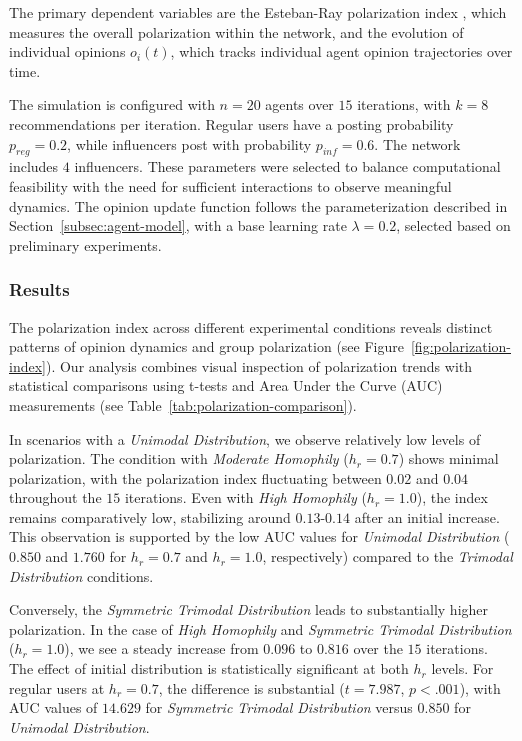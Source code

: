 The primary dependent variables are the Esteban-Ray polarization index \citep{esteban_on_1994}, which measures the overall polarization within the network, and the evolution of individual opinions $o_i(t)$, which tracks individual agent opinion trajectories over time.

The simulation is configured with $n = 20$ agents over $15$ iterations, with $k = 8$ recommendations per iteration. Regular users have a posting probability $p_{reg} = 0.2$, while influencers post with probability $p_{inf} = 0.6$. The network includes $4$ influencers. These parameters were selected to balance computational feasibility with the need for sufficient interactions to observe meaningful dynamics. The opinion update function follows the parameterization described in Section~\ref{subsec:agent-model}, with a base learning rate $\lambda = 0.2$, selected based on preliminary experiments.



\subsubsection{Results}

The polarization index across different experimental conditions reveals distinct patterns of opinion dynamics and group polarization (see Figure~\ref{fig:polarization-index}). Our analysis combines visual inspection of polarization trends with statistical comparisons using t-tests and Area Under the Curve (AUC) measurements (see Table~\ref{tab:polarization-comparison}).

In scenarios with a \emph{Unimodal Distribution}, we observe relatively low levels of polarization. The condition with \emph{Moderate Homophily} ($h_r = 0.7$) shows minimal polarization, with the polarization index fluctuating between $0.02$ and $0.04$ throughout the $15$ iterations. Even with \emph{High Homophily} ($h_r = 1.0$), the index remains comparatively low, stabilizing around $0.13$-$0.14$ after an initial increase. This observation is supported by the low AUC values for \emph{Unimodal Distribution} ($0.850$ and $1.760$ for $h_r = 0.7$ and $h_r = 1.0$, respectively) compared to the \emph{Trimodal Distribution} conditions.

Conversely, the \emph{Symmetric Trimodal Distribution} leads to substantially higher polarization. In the case of \emph{High Homophily} and \emph{Symmetric Trimodal Distribution} ($h_r = 1.0$), we see a steady increase from $0.096$ to $0.816$ over the $15$ iterations. The effect of initial distribution is statistically significant at both $h_r$ levels. For regular users at $h_r = 0.7$, the difference is substantial ($t = 7.987$, $p < .001$), with AUC values of $14.629$ for \emph{Symmetric Trimodal Distribution} versus $0.850$ for \emph{Unimodal Distribution}.

